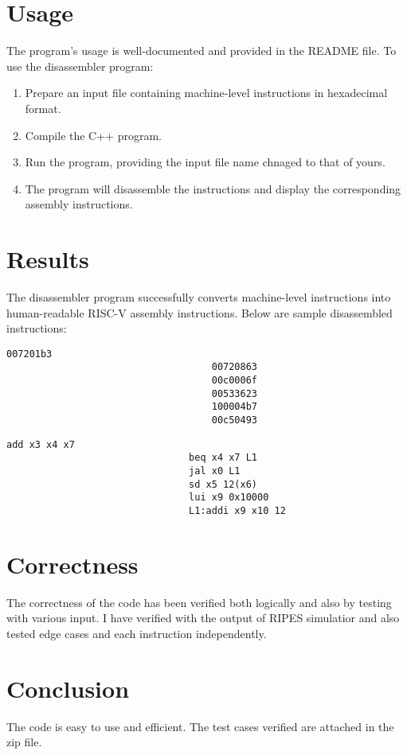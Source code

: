 \documentclass{article}
\begin{document}

\section{Usage}
The program's usage is well-documented and provided in the README file.
To use the disassembler program:

\begin{enumerate}
    \item Prepare an input file containing machine-level instructions in hexadecimal format.
    \item Compile the C++ program.
    \item Run the program, providing the input file name chnaged to that of yours.
    \item The program will disassemble the instructions and display the corresponding assembly instructions.
\end{enumerate}

\section{Results}
The disassembler program successfully converts machine-level instructions into human-readable RISC-V assembly instructions. Below are sample disassembled instructions:

\begin{lstlisting}[caption=Sample Input]
                                    007201b3
                                    00720863
                                    00c0006f
                                    00533623
                                    100004b7
                                    00c50493
\end{lstlisting}
\begin{lstlisting}[caption=Sample output]
                                add x3 x4 x7
                                beq x4 x7 L1
                                jal x0 L1
                                sd x5 12(x6)
                                lui x9 0x10000
                                L1:addi x9 x10 12
\end{lstlisting}
\section{Correctness}
The correctness of the code has been verified both logically and also by testing with various input. I have verified with the output of RIPES simulatior and also tested edge cases and each instruction independently.

\section{Conclusion}
The code is easy to use and efficient. The test cases verified are attached in the zip file.
\end{document}
